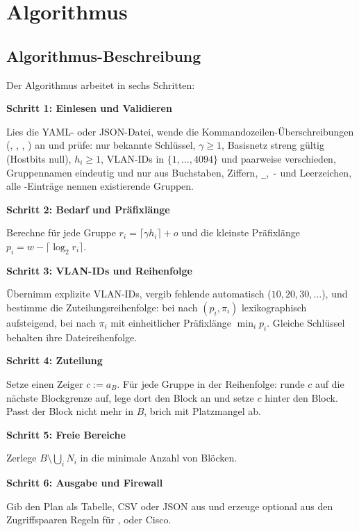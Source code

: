 \section{Algorithmus}

\subsection{Algorithmus-Beschreibung}

Der Algorithmus arbeitet in sechs Schritten:

\textbf{Schritt 1: Einlesen und Validieren}

Lies die YAML- oder JSON-Datei, wende die Kommandozeilen-Überschreibungen (, , , ) an und prüfe: nur bekannte Schlüssel, $\gamma \ge 1$, Basisnetz streng gültig (Hostbits null), $h_i \ge 1$, VLAN-IDs in $\{1,\ldots,4094\}$ und paarweise verschieden, Gruppennamen eindeutig und nur aus Buchstaben, Ziffern, \texttt{\_}, \texttt{-} und Leerzeichen, alle -Einträge nennen existierende Gruppen.

\textbf{Schritt 2: Bedarf und Präfixlänge}

Berechne für jede Gruppe $r_i = \lceil\gamma h_i\rceil + o$ und die kleinste Präfixlänge $p_i = w - \lceil \log_2 r_i \rceil$.

\textbf{Schritt 3: VLAN-IDs und Reihenfolge}

Übernimm explizite VLAN-IDs, vergib fehlende automatisch ($10, 20, 30, \ldots$), und bestimme die Zuteilungsreihenfolge: bei  nach $(p_i, \pi_i)$ lexikographisch aufsteigend, bei  nach $\pi_i$ mit einheitlicher Präfixlänge $\min_i p_i$. Gleiche Schlüssel behalten ihre Dateireihenfolge.

\textbf{Schritt 4: Zuteilung}

Setze einen Zeiger $c := a_B$. Für jede Gruppe in der Reihenfolge: runde $c$ auf die nächste Blockgrenze auf, lege dort den Block an und setze $c$ hinter den Block. Passt der Block nicht mehr in $B$, brich mit Platzmangel ab.

\textbf{Schritt 5: Freie Bereiche}

Zerlege $B \setminus \bigcup_i N_i$ in die minimale Anzahl von Blöcken.

\textbf{Schritt 6: Ausgabe und Firewall}

Gib den Plan als Tabelle, CSV oder JSON aus und erzeuge optional aus den Zugriffspaaren Regeln für ,  oder Cisco.

